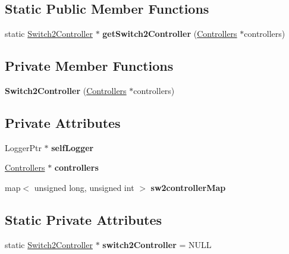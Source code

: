 \subsection*{\-Static \-Public \-Member \-Functions}
\begin{DoxyCompactItemize}
\item 
\hypertarget{classSwitch2Controller_a39fb54c11b77a78f4e1cd11d80a3fd6b}{static \hyperlink{classSwitch2Controller}{\-Switch2\-Controller} $\ast$ {\bfseries get\-Switch2\-Controller} (\hyperlink{classControllers}{\-Controllers} $\ast$controllers)}\label{classSwitch2Controller_a39fb54c11b77a78f4e1cd11d80a3fd6b}

\end{DoxyCompactItemize}
\subsection*{\-Private \-Member \-Functions}
\begin{DoxyCompactItemize}
\item 
\hypertarget{classSwitch2Controller_a85e0b1bb8f7464a4732825df23f4c943}{{\bfseries \-Switch2\-Controller} (\hyperlink{classControllers}{\-Controllers} $\ast$controllers)}\label{classSwitch2Controller_a85e0b1bb8f7464a4732825df23f4c943}

\end{DoxyCompactItemize}
\subsection*{\-Private \-Attributes}
\begin{DoxyCompactItemize}
\item 
\hypertarget{classSwitch2Controller_a0ad570d53019272e26614d2e685ec374}{\-Logger\-Ptr $\ast$ {\bfseries self\-Logger}}\label{classSwitch2Controller_a0ad570d53019272e26614d2e685ec374}

\item 
\hypertarget{classSwitch2Controller_a79c729d3d3703c81649828e0250d0d6d}{\hyperlink{classControllers}{\-Controllers} $\ast$ {\bfseries controllers}}\label{classSwitch2Controller_a79c729d3d3703c81649828e0250d0d6d}

\item 
\hypertarget{classSwitch2Controller_abaef0e77e1ae68ce8d20f6425003e492}{map$<$ unsigned long, unsigned int $>$ {\bfseries sw2controller\-Map}}\label{classSwitch2Controller_abaef0e77e1ae68ce8d20f6425003e492}

\end{DoxyCompactItemize}
\subsection*{\-Static \-Private \-Attributes}
\begin{DoxyCompactItemize}
\item 
\hypertarget{classSwitch2Controller_a98d13b3e331a0f074b675bf4037cc038}{static \hyperlink{classSwitch2Controller}{\-Switch2\-Controller} $\ast$ {\bfseries switch2\-Controller} = \-N\-U\-L\-L}\label{classSwitch2Controller_a98d13b3e331a0f074b675bf4037cc038}

\end{DoxyCompactItemize}



